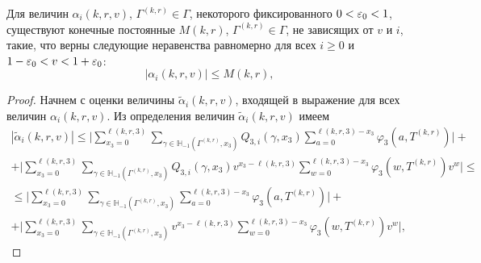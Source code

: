 \documentclass[a4paper,12pt,russian]{extarticle}
\begin{document}
\begin{lemma}
Для величин $\alpha_i(k,r,v)$, $\Gamma^{(k,r)} \in \Gamma$, некоторого фиксированного $0 \hm< \varepsilon_0 < 1$, существуют конечные постоянные $M(k,r)$, $\Gamma^{(k,r)}\in \Gamma$, не зависящих от $v$ и $i$, такие, что верны следующие неравенства равномерно для всех $i \geqslant 0$ и $ 1-\varepsilon_0 < v \hm< 1  + \varepsilon_0$:
\begin{equation}
|\alpha_i(k,r,v)| \leqslant M(k,r),
\end{equation}

\end{lemma}
\begin{proof}
Начнем с оценки величины $\tilde{\alpha}_i(k,r,v)$, входящей в выражение для всех величин $\alpha_i(k,r,v)$. Из определения величин $\tilde{\alpha}_i(k,r,v)$ имеем 
\begin{multline*}
|\tilde{\alpha}_i(k,r,v) | 
\leqslant
\biggl| \sum_{x_3=0}^{\ell(k,r,3)}\sum_{\gamma \in {\mathbb H}_{-1}(\Gamma^{(k,r)},x_3)} Q_{3,i}(\gamma,x_3) \sum_{a=0}^{\ell(k,r,3) - x_3} \varphi_3(a,T^{(k,r)}) \biggr| +  \\
+ \biggl| \sum_{x_3=0}^{\ell(k,r,3)}  \sum_{\gamma \in {\mathbb H}_{-1}(\Gamma^{(k,r)},x_3)} Q_{3,i}(\gamma,x_3) v^{x_3-\ell(k,r,3)}  \sum_{w=0}^{\ell(k,r,3) -x_3}
\varphi_3(w,T^{(k,r)}) v^w\biggr| \leqslant\\
\leqslant
\biggl| \sum_{x_3=0}^{\ell(k,r,3)}\sum_{\gamma \in {\mathbb H}_{-1}(\Gamma^{(k,r)},x_3)}  \sum_{a=0}^{\ell(k,r,3) - x_3} \varphi_3(a,T^{(k,r)}) \biggr| +  \\
+ \biggl| \sum_{x_3=0}^{\ell(k,r,3)}  \sum_{\gamma \in {\mathbb H}_{-1}(\Gamma^{(k,r)},x_3)}  v^{x_3-\ell(k,r,3)}  \sum_{w=0}^{\ell(k,r,3) -x_3}
\varphi_3(w,T^{(k,r)}) v^w\biggr|,

\end{multline*}
\end{proof}
\end{document}
